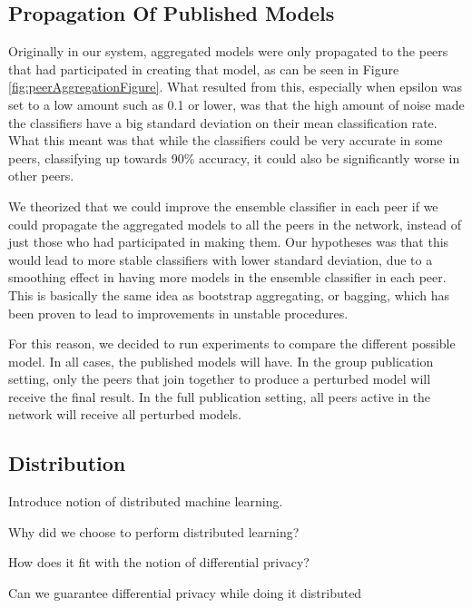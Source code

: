 \subsection{Propagation Of Published Models} \label{sec:PropagationPubModel}

Originally in our system, aggregated models were only propagated to the peers that had participated in creating that model, as can be seen in Figure \ref{fig:peerAggregationFigure}. What resulted from this, especially when epsilon was set to a low amount such as 0.1 or lower, was that the high amount of noise made the classifiers have a big standard deviation on their mean classification rate. What this meant was that while the classifiers could be very accurate in some peers, classifying up towards 90\% accuracy, it could also be significantly worse in other peers. 

We theorized that we could improve the ensemble classifier in each peer if we could propagate the aggregated models to all the peers in the network, instead of just those who had participated in making them. Our hypotheses was that this would lead to more stable classifiers with lower standard deviation, due to a smoothing effect in having more models in the ensemble classifier in each peer. This is basically the same idea as bootstrap aggregating, or bagging, which has been proven to lead to improvements in unstable procedures\cite{breiman1996bagging}. 

For this reason, we decided to run experiments to compare the different possible model. In all cases, the published models will have. In the group publication setting, only the peers that join together to produce a perturbed model will receive the final result. In the full publication setting, all peers active in the network will receive all perturbed models.


\subsection{Distribution}
Introduce notion of distributed machine learning. 

Why did we choose to perform distributed learning?

How does it fit with the notion of differential privacy?

Can we guarantee differential privacy while doing it distributed

